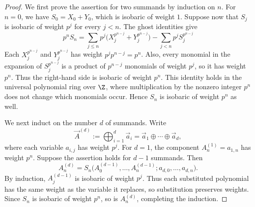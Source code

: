 \begin{proof}
We first prove the assertion for two summands by induction on $n$.
For $n=0$, we have $S_0=X_0+Y_0$, which is isobaric of weight $1$.
Suppose now that $S_j$ is isobaric of weight $p^j$ for every $j<n$.
The ghost identities give
\[
p^n S_n = \sum_{j \le n} p^j \bigl(X_j^{p^{n-j}} + Y_j^{p^{n-j}}\bigr)
- \sum_{j < n} p^j S_j^{p^{n-j}}
\]
Each $X_j^{p^{n-j}}$ and $Y_j^{p^{n-j}}$ has weight
$p^j p^{n-j}=p^n$. Also, every monomial in the expansion of
$S_j^{p^{n-j}}$ is a product of $p^{n-j}$ monomials of weight $p^j$,
so it has weight $p^n$. Thus the right-hand side is isobaric of weight
$p^n$. This identity holds in the universal polynomial ring over $\Z$,
where multiplication by the nonzero integer $p^n$ does not change which
monomials occur. Hence $S_n$ is isobaric of weight $p^n$ as well.

We next induct on the number $d$ of summands. Write
\[
\vec A^{(d)}:=\bigoplus_{i=1}^{d}\vec a_i
=\vec a_1\oplus\cdots\oplus\vec a_d,
\]
where each variable $a_{i,j}$ has weight $p^j$. For $d=1$, the component
$A_n^{(1)}=a_{1,n}$ has weight $p^n$. Suppose the assertion holds for
$d-1$ summands. Then
\[
A_n^{(d)}=
S_n\bigl(A_0^{(d-1)},\dots,A_n^{(d-1)};
a_{d,0},\dots,a_{d,n}\bigr).
\]
By induction, $A_j^{(d-1)}$ is isobaric of weight $p^j$.
Thus each substituted polynomial has the same weight as the variable it
replaces, so substitution preserves weights. Since $S_n$ is isobaric of
weight $p^n$, so is $A_n^{(d)}$, completing the induction.
\end{proof}

